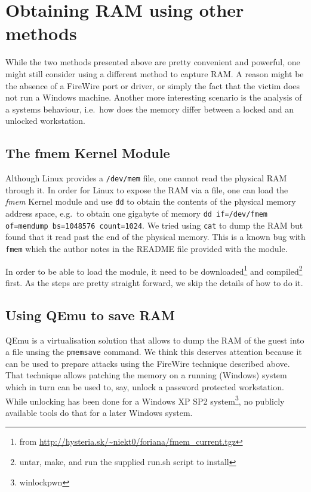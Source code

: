 \documentclass[a4paper,
    11pt,
    normalheadings,
    parindent,
    UKenglish,
    abstracton,
    ]{scrartcl}
\begin{document}
\section{Obtaining RAM using other methods}
While the two methods presented above are pretty convenient and powerful, one might still consider using a different method to capture RAM.
A reason might be the absence of a FireWire port or driver, or simply the fact that the victim does not run a Windows machine.
Another more interesting scenario is the analysis of a systems behaviour, i.e.\, how does the memory differ between a locked and an unlocked workstation.

\subsection{The fmem Kernel Module}
Although Linux provides a \texttt{/dev/mem} file, one cannot read the physical RAM through it.
In order for Linux to expose the RAM via a file, one can load the \emph{fmem} Kernel module and use \texttt{dd} to obtain the contents of the physical memory address space, e.g.\, to obtain one gigabyte of memory \texttt{dd if=/dev/fmem of=memdump bs=1048576 count=1024}.
We tried using \texttt{cat} to dump the RAM but found that it read past the end of the physical memory.
This is a known bug with \texttt{fmem} which the author notes in the README file provided with the module.


In order to be able to load the module, it need to be downloaded\footnote{from \url{http://hysteria.sk/~niekt0/foriana/fmem_current.tgz}} and compiled\footnote{untar, make, and run the supplied run.sh script to install} first.
As the steps are pretty straight forward, we skip the details of how to do it.


\subsection{Using QEmu to save RAM}
QEmu is a virtualisation solution that allows to dump the RAM of the guest into a file unsing the \texttt{pmemsave} command.
We think this deserves attention because it can be used to prepare attacks using the FireWire technique described above.
That technique allows patching the memory on a running (Windows) system which in turn can be used to, say, unlock a password protected workstation.
While unlocking has been done for a Windows XP SP2 system\footnote{winlockpwn}, no publicly available tools do that for a later Windows system.
\end{document}
